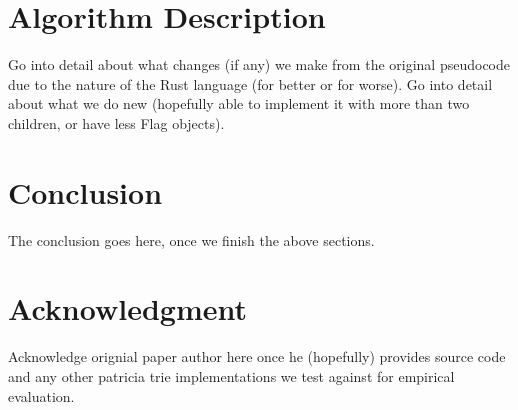 \documentclass[conference]{IEEEtran}
\begin{document}
\section{Algorithm Description}
Go into detail about what changes (if any) we make from the original pseudocode due to the nature of the Rust language (for better or for worse). Go into detail about what we do new (hopefully able to implement it with more than two children, or have less Flag objects).


\section{Conclusion}
The conclusion goes here, once we finish the above sections.


\section{Acknowledgment}
Acknowledge orignial paper author here once he (hopefully) provides source code and any other patricia trie implementations we test against for empirical evaluation.


\appendix
\end{document}
